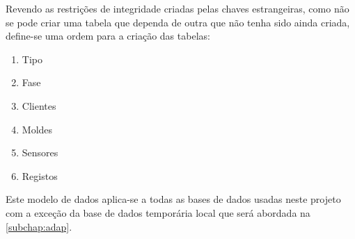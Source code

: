 \documentclass[11pt,twoside,a4paper]{report}
\begin{document}
Revendo as restrições de integridade criadas pelas chaves estrangeiras, como não se pode criar uma tabela que dependa de outra que não tenha sido ainda criada, define-se uma ordem para a criação das tabelas:
\begin{enumerate}[noitemsep]
	\item Tipo
	\item Fase
	\item Clientes
	\item Moldes
	\item Sensores
	\item Registos
\end{enumerate}
Este modelo de dados aplica-se a todas as bases de dados usadas neste projeto com a exceção da base de dados temporária local que será abordada na \autoref{subchap:adap}.
\end{document}
